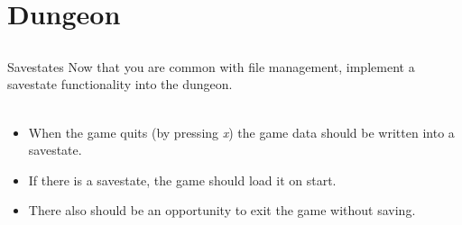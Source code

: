 \section{Dungeon}
\subsection{}
\begin{frame}{Savestates}
	Now that you are common with file management, implement a savestate functionality into the dungeon.\\\ \\
	\begin{itemize}
		\item When the game quits (by pressing \textit{x}) the game data should be written into a savestate.
		\item If there is a savestate, the game should load it on start.
		\item There also should be an opportunity to exit the game without saving.
	\end{itemize}
\end{frame}


